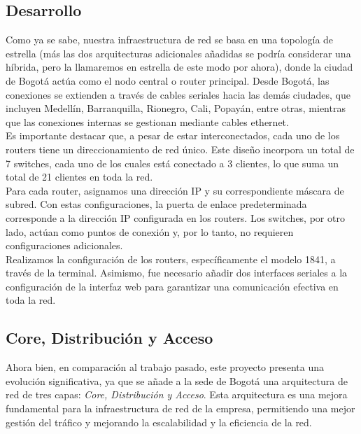 \newpage
\subsection{Desarrollo}

Como ya se sabe, nuestra infraestructura de red se basa en una topología de
estrella (más las dos arquitecturas adicionales añadidas se podría considerar
una híbrida, pero la llamaremos en estrella de este modo por ahora), donde la
ciudad de Bogotá actúa como el nodo central o router
principal. Desde Bogotá, las conexiones se extienden a través de cables seriales
hacia las demás ciudades, que incluyen Medellín, Barranquilla, Rionegro, Cali,
Popayán, entre otras, mientras que las conexiones internas se gestionan mediante
cables ethernet.
\\

Es importante destacar que, a pesar de estar interconectados, cada uno de los
routers tiene un direccionamiento de red único. Este diseño incorpora un total
de 7 switches, cada uno de los cuales está conectado a 3 clientes, lo que suma
un total de 21 clientes en toda la red.
\\

Para cada router, asignamos una dirección IP y su correspondiente máscara de
subred. Con estas configuraciones, la puerta de enlace predeterminada
corresponde a la dirección IP configurada en los routers. Los switches, por otro
lado, actúan como puntos de conexión y, por lo tanto, no requieren configuraciones adicionales.
\\

Realizamos la configuración de los routers, específicamente el modelo 1841, a
través de la terminal. Asimismo, fue necesario añadir dos interfaces seriales a
la configuración de la interfaz web para garantizar una comunicación efectiva en
toda la red.
\\

\subsection{Core, Distribución y Acceso}

Ahora bien, en comparación al trabajo pasado, este proyecto presenta una
evolución significativa, ya que se añade a la sede de Bogotá una arquitectura de
red de tres capas: \textit{Core, Distribución y Acceso}. Esta arquitectura es
una mejora fundamental para la infraestructura de red de la empresa, permitiendo
una mejor gestión del tráfico y mejorando la escalabilidad y la eficiencia de la
red.
\\

